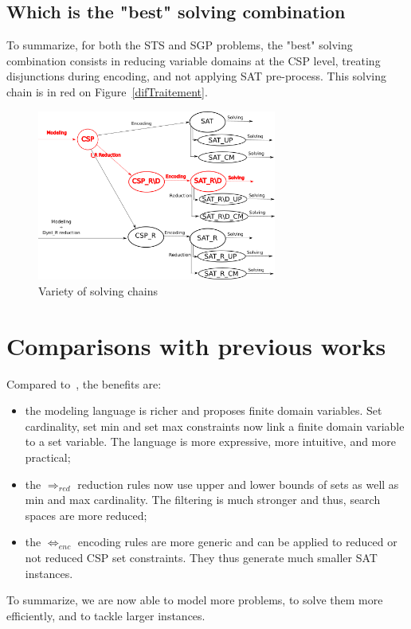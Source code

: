 \documentclass[3p,authoryear,times]{elsarticle}
\newcommand{\rmin}[0]{{\Rightarrow_{red}}}
\newcommand{\enc}[0]{\Leftrightarrow_{enc}}
\begin{document}
\subsection{Which is the "best" solving combination}

To summarize, for both the STS and SGP problems, the "best" solving combination consists in reducing variable domains at the CSP level, treating disjunctions during encoding, and not applying SAT pre-process. This solving chain is in red on Figure~\ref{difTraitement}.

\begin{figure}[h]
\caption{Variety of solving chains}
\label{difTraitement}
\label{flow}
\begin{center}
\includegraphics[width=0.7\textwidth]{Figures/encoding2018}
\end{center}
\end{figure}

\color{red}
\section{Comparisons with previous works}
\label{sec:comparisons}

Compared to~\cite{aor}, the benefits are:
\begin{itemize}
\item the modeling language is richer and proposes finite domain variables. Set cardinality, set min and set max constraints now link a finite domain variable to a set variable. The language is more expressive, more intuitive, and more practical;
\item the $\rmin$ reduction rules now use upper and lower bounds of sets as well as min and max cardinality. The filtering is much stronger and thus, search spaces are more reduced;
\item the $\enc$ encoding rules are more generic and can be applied to reduced or not reduced CSP set constraints. They thus generate much smaller SAT instances.
\end{itemize}
To summarize, we are now able to model more problems, to solve them more efficiently, and to tackle larger instances.
\end{document}

